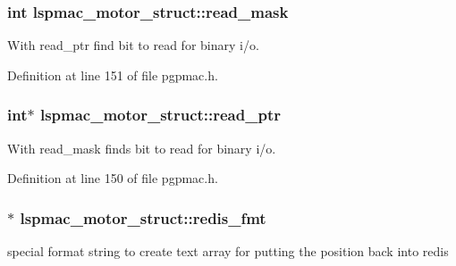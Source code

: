 \hypertarget{structlspmac__motor__struct_a3c24ed30c5a3ad490c6139b2780b2af7}{
\subsubsection[{read\-\_\-mask}]{\setlength{\rightskip}{0pt plus 5cm}int lspmac\-\_\-motor\-\_\-struct\-::read\-\_\-mask}}\label{structlspmac__motor__struct_a3c24ed30c5a3ad490c6139b2780b2af7}


With read\-\_\-ptr find bit to read for binary i/o. 



Definition at line 151 of file pgpmac.\-h.

\hypertarget{structlspmac__motor__struct_a844b28ccabab5048ca216db074fb9704}{
\subsubsection[{read\-\_\-ptr}]{\setlength{\rightskip}{0pt plus 5cm}int$\ast$ lspmac\-\_\-motor\-\_\-struct\-::read\-\_\-ptr}}\label{structlspmac__motor__struct_a844b28ccabab5048ca216db074fb9704}


With read\-\_\-mask finds bit to read for binary i/o. 



Definition at line 150 of file pgpmac.\-h.

\hypertarget{structlspmac__motor__struct_a91c38b2072d878b71f4e77de2f1375a4}{
\subsubsection[{redis\-\_\-fmt}]{$\ast$ lspmac\-\_\-motor\-\_\-struct\-::redis\-\_\-fmt}}\label{structlspmac__motor__struct_a91c38b2072d878b71f4e77de2f1375a4}


special format string to create text array for putting the position back into redis 



